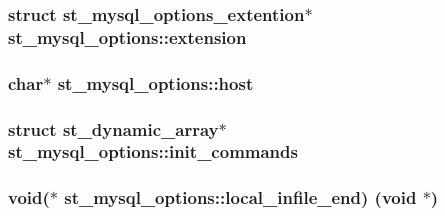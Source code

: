 \subsubsection[{extension}]{\setlength{\rightskip}{0pt plus 5cm}struct st\+\_\+mysql\+\_\+options\+\_\+extention$\ast$ st\+\_\+mysql\+\_\+options\+::extension}\label{structst__mysql__options_ac16c1d9c8c28b3daeabb7222cda5e8c2}
\hypertarget{structst__mysql__options_a79fc433d16a9cd4b913a6490fc612bf3}{}
\subsubsection[{host}]{\setlength{\rightskip}{0pt plus 5cm}char$\ast$ st\+\_\+mysql\+\_\+options\+::host}\label{structst__mysql__options_a79fc433d16a9cd4b913a6490fc612bf3}
\hypertarget{structst__mysql__options_a6f9eb2e4acb59618e0843bb3c63f58f4}{}
\subsubsection[{init\+\_\+commands}]{\setlength{\rightskip}{0pt plus 5cm}struct st\+\_\+dynamic\+\_\+array$\ast$ st\+\_\+mysql\+\_\+options\+::init\+\_\+commands}\label{structst__mysql__options_a6f9eb2e4acb59618e0843bb3c63f58f4}
\hypertarget{structst__mysql__options_a45658a7c3298bbd90e9dc61cee282f05}{}
\subsubsection[{local\+\_\+infile\+\_\+end}]{\setlength{\rightskip}{0pt plus 5cm}void($\ast$ st\+\_\+mysql\+\_\+options\+::local\+\_\+infile\+\_\+end) (void $\ast$)}\label{structst__mysql__options_a45658a7c3298bbd90e9dc61cee282f05}
\hypertarget{structst__mysql__options_a79b831a574398e1ba37f0c7052318269}{}
